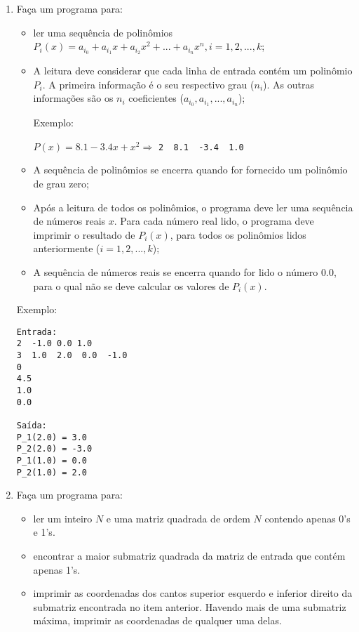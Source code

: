\begin{enumerate}
\item Faça um programa para:
\begin{itemize}
    \item ler uma sequência de polinômios 
    $P_i(x)=a_{i_0} + a_{i_1}x + a_{i_2}x^2 + ... + a_{i_n}x^n, i=1,2,...,k$; 

    \item A leitura deve considerar que cada linha de entrada    
    contém um polinômio $P_i$. A primeira informação é o seu 
    respectivo grau ($n_i$). As outras informações são os
    $n_i$ coeficientes ($a_{i_0}, a_{i_1}, ..., a_{i_n}$);
    
    Exemplo:
    
    $P(x) = 8.1 -3.4x + x^2  \Longrightarrow $ \verb|2  8.1  -3.4  1.0|
    
    \item A sequência de polinômios se encerra quando for fornecido um 
    polinômio de grau zero; 
    
    \item Após a leitura de todos os polinômios, o programa deve ler uma 
    sequência de números reais $x$. Para cada número real lido, o programa 
    deve imprimir o resultado de $P_i(x)$, para todos os polinômios lidos 
    anteriormente ($i=1,2,...,k$);
    
    \item A sequência de números reais se encerra quando for lido o número 
    $0.0$, para o qual não se deve calcular os valores de $P_i(x)$.
\end{itemize}    
    
Exemplo:
\begin{verbatim}
Entrada:
2  -1.0 0.0 1.0
3  1.0  2.0  0.0  -1.0
0
4.5
1.0
0.0

Saída:
P_1(2.0) = 3.0
P_2(2.0) = -3.0
P_1(1.0) = 0.0
P_2(1.0) = 2.0
\end{verbatim}


\item Faça um programa para:

\begin{itemize}
\item ler um inteiro $N$ e uma matriz quadrada de ordem $N$ contendo apenas
      0's e 1's.
\item encontrar a maior submatriz quadrada da matriz de entrada
      que contém apenas 1's.
\item imprimir as coordenadas dos cantos superior esquerdo e
      inferior direito da submatriz encontrada no item anterior. Havendo mais 
      de uma submatriz máxima, imprimir as coordenadas de qualquer uma delas.
\end{itemize}



\end{enumerate}
